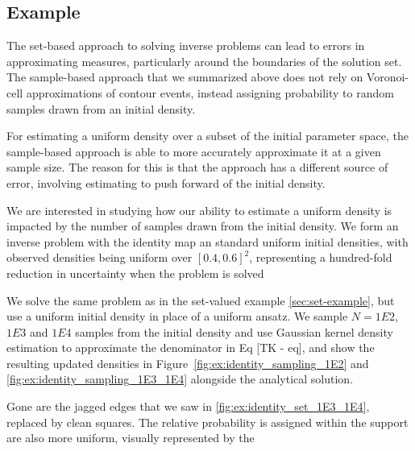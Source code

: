 \subsection{Example}\label{sec:sample-example}

The set-based approach to solving inverse problems can lead to errors in approximating measures, particularly around the boundaries of the solution set.
The sample-based approach that we summarized above does not rely on Voronoi-cell approximations of contour events, instead assigning probability to random samples drawn from an initial density.

For estimating a uniform density over a subset of the initial parameter space, the sample-based approach is able to more accurately approximate it at a given sample size.
The reason for this is that the approach has a different source of error, involving estimating to push forward of the initial density.

We are interested in studying how our ability to estimate a uniform density is impacted by the number of samples drawn from the initial density.
We form an inverse problem with the identity map an standard uniform initial densities, with observed densities being uniform over $[0.4, 0.6]^2$, representing a hundred-fold reduction in uncertainty when the problem is solved

We solve the same problem as in the set-valued example \ref{sec:set-example}, but use a uniform initial density in place of a uniform ansatz.
We sample $N=1E2$, $1E3$ and $1E4$ samples from the initial density and use Gaussian kernel density estimation to approximate the denominator in Eq [TK - eq], and show the resulting updated densities in Figure~\ref{fig:ex:identity_sampling_1E2} and \ref{fig:ex:identity_sampling_1E3_1E4} alongside the analytical solution.

Gone are the jagged edges that we saw in \ref{fig:ex:identity_set_1E3_1E4}, replaced by clean squares.
The relative probability is assigned within the support are also more uniform, visually represented by the

